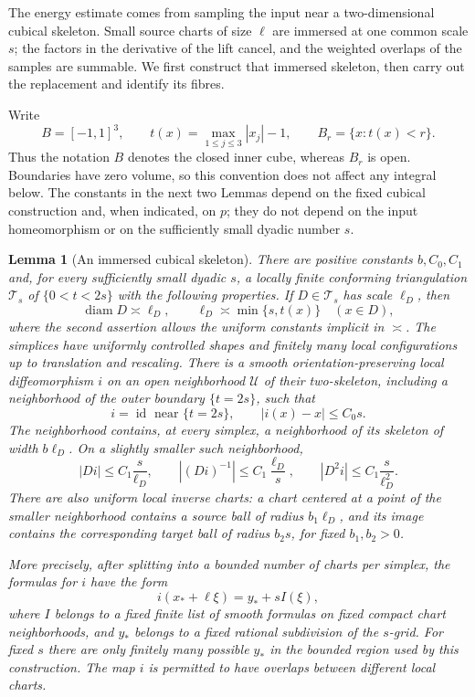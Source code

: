 \documentclass[11pt]{article}
\numberwithin{equation}{section}
\newtheorem{lemma}[theorem]{Lemma}
\theoremstyle{definition}
\theoremstyle{remark}
\newcommand{\Id}{\operatorname{id}}
\DeclareMathOperator{\diam}{diam}
\begin{document}
The energy estimate comes from sampling the input near a
two-dimensional cubical skeleton.  Small source charts of size $\ell$
are immersed at one common scale $s$; the factors in the derivative of
the lift cancel, and the weighted overlaps of the samples are summable.
We first construct that immersed skeleton, then carry out the
replacement and identify its fibres.

Write
\[
 B=[-1,1]^3,\qquad t(x)=\max_{1\leq j\leq3}|x_j|-1,
 \qquad B_r=\{x:t(x)<r\}.
\]
Thus the notation $B$ denotes the closed inner cube, whereas $B_r$ is
open.  Boundaries have zero volume, so this convention does not affect
any integral below.  The constants in the next two Lemmas depend on the fixed cubical
construction and, when indicated, on $p$; they do not depend on the input
homeomorphism or on the sufficiently small dyadic number $s$.

\begin{lemma}[An immersed cubical skeleton]\label{hp:immersed-skeleton}
There are positive constants $b,C_0,C_1$ and, for every sufficiently small
dyadic $s$, a locally finite conforming triangulation $\mathcal T_s$ of
$\{0<t<2s\}$ with the following properties.  If $D\in\mathcal T_s$ has
scale $\ell_D$, then
\[
 \diam D\asymp\ell_D,
 \qquad \ell_D\asymp\min\{s,t(x)\}\quad(x\in D),
\]
where the second assertion allows the uniform constants implicit in
$\asymp$.  The simplices have uniformly controlled shapes and finitely
many local configurations up to translation and rescaling.  There is a
smooth orientation-preserving local diffeomorphism $i$ on an open
neighborhood $\mathcal U$ of their two-skeleton, including a neighborhood
of the outer boundary $\{t=2s\}$, such that
\[
 i=\Id\text{ near }\{t=2s\},\qquad
 |i(x)-x|\leq C_0s.
\]
The neighborhood contains, at every simplex, a neighborhood of its
skeleton of width $b\ell_D$.  On a slightly smaller such neighborhood,
\begin{equation}\label{hp:immersion-bounds}
 |Di|\leq C_1\frac{s}{\ell_D},\qquad
 |(Di)^{-1}|\leq C_1\frac{\ell_D}{s},\qquad
 |D^2i|\leq C_1\frac{s}{\ell_D^2}.
\end{equation}
There are also uniform local inverse charts: a chart centered at a
point of the smaller neighborhood contains a source ball of radius
$b_1\ell_D$, and its image contains the corresponding target ball of
radius $b_2s$, for fixed $b_1,b_2>0$.

More precisely, after splitting into a bounded number of charts per
simplex, the formulas for $i$ have the form
\begin{equation}\label{hp:immersion-template}
 i(x_*+\ell\xi)=y_*+sI(\xi),
\end{equation}
where $I$ belongs to a fixed finite list of smooth formulas on fixed
compact chart neighborhoods, and $y_*$ belongs to a fixed rational
subdivision of the $s$-grid.  For fixed $s$ there are only finitely many
possible $y_*$ in the bounded region used by this construction.  The
map $i$ is permitted to have overlaps between different local charts.
\end{lemma}
\end{document}
